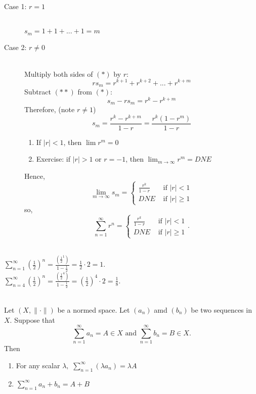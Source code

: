 \begin{description}
    \item[Case 1: $r = 1$] \leavevmode \\
    $s_m = 1 + 1 + ... + 1 = m$
    \item[Case 2: $r \not = 0$] \leavevmode \\
    Multiply both sides of $(*)$ by $r$:
    \begin{equation*}
        r s_m = r^{k+1} + r^{k+2} + ... + r^{k + m} \tag{$**$}
    \end{equation*}
    Subtract $(**)$ from $(*)$:
    $$s_m - r s_m = r^k - r^{k+m}$$
    Therefore, (note $r \not = 1$)
    $$s_m = \frac{r^k - r^{k+m}}{1 - r} = \frac{r^k \left(1 - r^m\right)}{1-r}$$
    \begin{note} \leavevmode
        \begin{enumerate}[*)]
            \item If $|r| < 1$, then $\lim r^m = 0$
            \item Exercise: if $|r| > 1$ or $r = -1$, then $\lim_{m \to \infty} r^m = DNE$
        \end{enumerate}
    \end{note}
    Hence,
    $$\lim_{m \to \infty} s_m =
    \begin{cases*}
        \frac{r^k}{1-r} &\text{ if $|r| < 1$} \\
        DNE &\text{ if $|r| \geq 1$}
    \end{cases*}$$
    so,
    $$\sum_{n=1}^{\infty} r^n =
    \begin{cases*}
        \frac{r^k}{1-r} &\text{ if $|r| < 1$} \\
        DNE &\text{ if $|r| \geq 1$}
    \end{cases*}.$$
\end{description}

\begin{example}\leavevmode \\
    $\sum_{n=1}^{\infty} \left(\frac{1}{2}\right)^n = \frac{\left(\frac{1}{2} ^1\right)}{1-\frac{1}{2}} = \frac{1}{2} \cdot 2 = 1.$ \\
    $\sum_{n=4}^{\infty} \left(\frac{1}{2}\right)^n = \frac{\left(\frac{1}{2} ^4\right)}{1-\frac{1}{2}} = \left(\frac{1}{2}\right) ^4 \cdot 2 = \frac{1}{8}.$
\end{example}

\begin{theorem}  \leavevmode \\
    \label{thm3.47}
    Let $\left(X, \| \cdot \|\right)$ be a normed space. Let $(a_n)$ amd $(b_n)$ be two sequences in $X$. Suppose that
    $$\sum_{n=1}^{\infty} a_n = A \in X \text{ and } \sum_{n=1}^{\infty}b_n = B \in X.$$
    Then
    \begin{enumerate}[$(i)$]
        \item For any scalar $\lambda,$ $\sum_{n=1}^{\infty}(\lambda a_n) = \lambda A$
        \item $\sum_{n=1}^{\infty} a_n + b_n = A + B$
    \end{enumerate}
\end{theorem}

